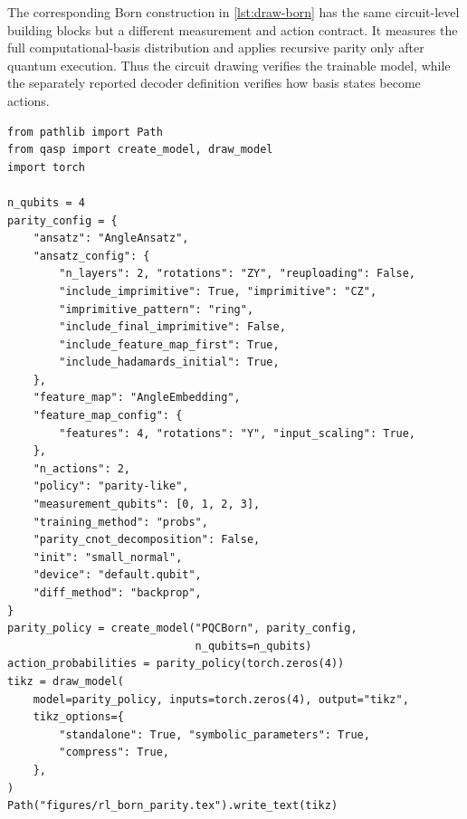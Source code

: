 \documentclass[10pt]{article}
\newcommand{\code}[1]{\texttt{#1}}
\begin{document}
The corresponding Born construction in \cref{lst:draw-born} has the same circuit-level building blocks but a different measurement and action contract.  It measures the full computational-basis distribution and applies recursive parity only after quantum execution.  Thus the circuit drawing verifies the trainable model, while the separately reported decoder definition verifies how basis states become actions.

\begin{lstlisting}[caption={Constructing and drawing a Born parity policy.  The returned forward value is a normalized two-action probability vector and must be passed to \code{Categorical(probs=...)}.},label={lst:draw-born}]
from pathlib import Path
from qasp import create_model, draw_model
import torch

n_qubits = 4
parity_config = {
    "ansatz": "AngleAnsatz",
    "ansatz_config": {
        "n_layers": 2, "rotations": "ZY", "reuploading": False,
        "include_imprimitive": True, "imprimitive": "CZ",
        "imprimitive_pattern": "ring",
        "include_final_imprimitive": False,
        "include_feature_map_first": True,
        "include_hadamards_initial": True,
    },
    "feature_map": "AngleEmbedding",
    "feature_map_config": {
        "features": 4, "rotations": "Y", "input_scaling": True,
    },
    "n_actions": 2,
    "policy": "parity-like",
    "measurement_qubits": [0, 1, 2, 3],
    "training_method": "probs",
    "parity_cnot_decomposition": False,
    "init": "small_normal",
    "device": "default.qubit",
    "diff_method": "backprop",
}
parity_policy = create_model("PQCBorn", parity_config,
                             n_qubits=n_qubits)
action_probabilities = parity_policy(torch.zeros(4))
tikz = draw_model(
    model=parity_policy, inputs=torch.zeros(4), output="tikz",
    tikz_options={
        "standalone": True, "symbolic_parameters": True,
        "compress": True,
    },
)
Path("figures/rl_born_parity.tex").write_text(tikz)
\end{lstlisting}
\end{document}
